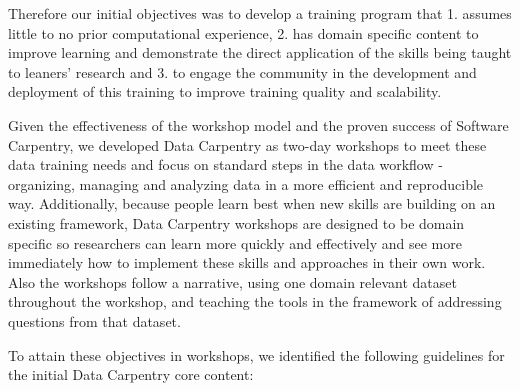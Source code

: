 \documentclass[15]{idcc}
\begin{document}
Therefore our initial objectives was to develop a training program that 1. assumes little to no
prior computational experience, 2. has domain specific content to improve learning and demonstrate
the direct application of the skills being taught to leaners' research and 3. to engage the community in the
development and deployment of this training to improve training quality and scalability.

Given the effectiveness of the workshop model and the proven success of Software Carpentry, we developed
Data Carpentry as two-day workshops to meet these data training needs and focus on standard steps in the data workflow -
organizing, managing and analyzing data
in a more efficient and reproducible way. Additionally, because people learn best when new skills are building on
an existing framework, Data Carpentry workshops are designed to be domain specific so researchers can learn more
quickly and effectively and see more
immediately how to implement these skills and approaches in their own work. Also the workshops follow a narrative, using one
domain relevant dataset throughout the workshop, and teaching the tools in the framework of addressing questions from
that dataset.

To attain these objectives in workshops, we identified the following guidelines for the initial Data Carpentry core content:
\end{document}
